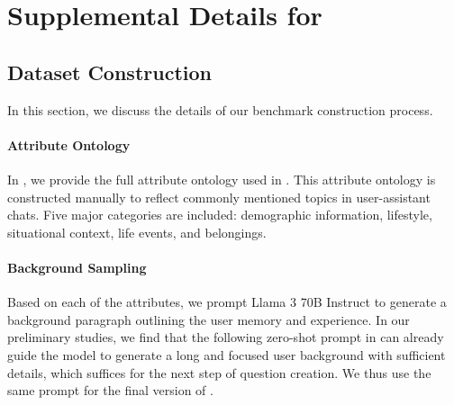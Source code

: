 \appendix
\clearpage

\section{Supplemental Details for \BENCHMARK{}}
\label{appendix-benchmark-supp-details}


\subsection{Dataset Construction}
\label{appendix-dataset-construction}

In this section, we discuss the details of our benchmark construction process.

\paragraph{Attribute Ontology} In , we provide the full attribute ontology used in \BENCHMARK{}.  This attribute ontology is constructed manually to reflect commonly mentioned topics in user-assistant chats. Five major categories are included: demographic information, lifestyle, situational context, life events, and belongings.



\paragraph{Background Sampling} Based on each of the attributes, we prompt Llama 3 70B Instruct to generate a background paragraph outlining the user memory and experience. In our preliminary studies, we find that the following zero-shot prompt in  can already guide the model to generate a long and focused user background with sufficient details, which suffices for the next step of question creation. We thus use the same prompt for the final version of \BENCHMARK{}.




